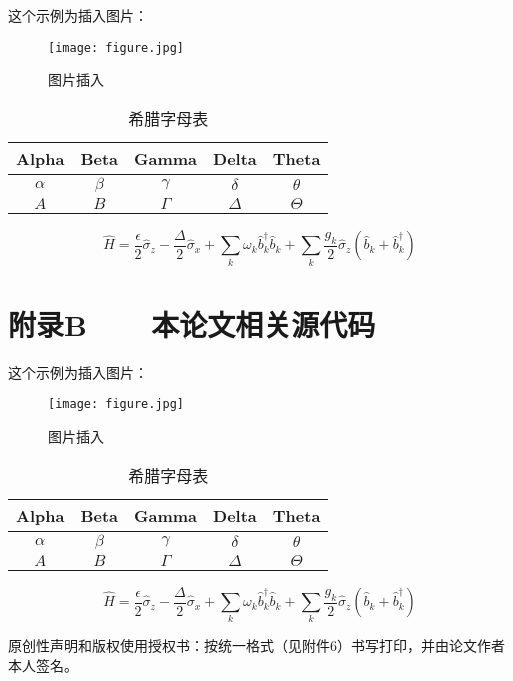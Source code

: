这个示例为插入图片：
\begin{figure}[H]
	\centering
	\texttt{[image: figure.jpg]}%
	\caption{图片插入\label{fig:appA}}
\end{figure}

\begin{table}[H]
	\begin{center}
		\caption{希腊字母表\label{tab:appA}}
		\begin{tabular}{|c|c|c|c|c|}
			\hline
			Alpha    & Beta    & Gamma    & Delta    & Theta    \\
			\hline
			$\alpha$ & $\beta$ & $\gamma$ & $\delta$ & $\theta$ \\
			\hline
			$A$      & $B$     & $\Gamma$ & $\Delta$ & $\Theta$ \\
			\hline
		\end{tabular}
	\end{center}
\end{table}

\begin{equation}
	\hat{H}=\frac{\epsilon}{2}\hat{\sigma}_{z}-\frac{\Delta}{2}\hat{\sigma}_{x}+\sum_{k}\omega_{k}\hat{b}_{k}^{\dagger}\hat{b}_{k}+\sum_{k}\frac{g_{k}}{2}\hat{\sigma}_{z}(\hat{b}_{k}+\hat{b}_{k}^{\dagger})\label{eq:appA}
\end{equation}

\chapter*{附录B~~~~本论文相关源代码}
这个示例为插入图片：
\begin{figure}[H]
	\centering
	\texttt{[image: figure.jpg]}%
	\caption{图片插入\label{fig:appB}}
\end{figure}

\begin{table}[H]
	\begin{center}
		\caption{希腊字母表\label{tab:appB}}
		\begin{tabular}{|c|c|c|c|c|}
			\hline
			Alpha    & Beta    & Gamma    & Delta    & Theta    \\
			\hline
			$\alpha$ & $\beta$ & $\gamma$ & $\delta$ & $\theta$ \\
			\hline
			$A$      & $B$     & $\Gamma$ & $\Delta$ & $\Theta$ \\
			\hline
		\end{tabular}
	\end{center}
\end{table}

\begin{equation}
	\hat{H}=\frac{\epsilon}{2}\hat{\sigma}_{z}-\frac{\Delta}{2}\hat{\sigma}_{x}+\sum_{k}\omega_{k}\hat{b}_{k}^{\dagger}\hat{b}_{k}+\sum_{k}\frac{g_{k}}{2}\hat{\sigma}_{z}(\hat{b}_{k}+\hat{b}_{k}^{\dagger})\label{eq:appB}
\end{equation}

原创性声明和版权使用授权书：按统一格式（见附件6）书写打印，并由论文作者本人签名。